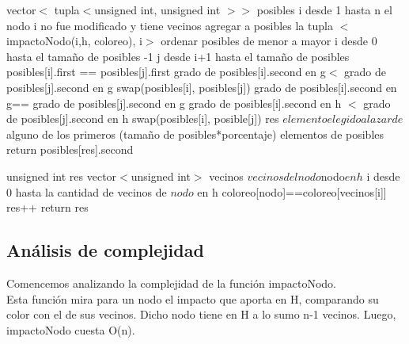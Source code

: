 \begin{algorithm}[H]
\caption{} 
\begin{codebox}
\li
\li 	vector$<$ tupla$<$unsigned int, unsigned int $> >$ posibles
\li     \For i desde 1 hasta n \Do
\li  		\If el nodo i no fue modificado y tiene vecinos \Do
\li				agregar a posibles la tupla $<$impactoNodo(i,h, coloreo), i$>$
			\End
		\End
\li 
\li 	ordenar posibles de menor a mayor
\li 	
\li 	\For i desde 0 hasta el tamaño de posibles -1 \Do
\li
\li 		\For j desde i+1 hasta el tamaño de posibles \Do
\li
\li 			\If posibles[i].first == posibles[j].first \Do
\li 				
\li 					\If grado de posibles[i].second en g$<$ grado de posibles[j].second en g\Do
\li 						swap(posibles[i], posibles[j])
						\End
\li						\Else 
\li 						\If grado de posibles[i].second en g== grado de posibles[j].second en g \Do
\li 							\If grado de posibles[i].second en h $<$ grado de posibles[j].second en h \Do
\li										swap(posibles[i], posible[j])
								\End
							\End
						\End
				\End
			\End
		\End
\li
\li
\li res \gets $elemento elegido al azar de $ 
\li          alguno de los primeros (tamaño de posibles*porcentaje) elementos de posibles
\li
\li return posibles[res].second
\li
\End
\end{codebox}
\end{algorithm}



\begin{algorithm}[H]
\caption{} 
\begin{codebox}
\li
\li unsigned int res 
\li vector$<$unsigned int$>$ vecinos \gets $vecinos del nodo $nodo$ en h$
\li
\li \For i desde 0 hasta la cantidad de vecinos de $nodo$ en h \Do
\li
\li 	\If coloreo[nodo]==coloreo[vecinos[i]] \Do
\li 		res++
		\End
	\End
\li
\li return res
\End
\end{codebox}
\end{algorithm}



\subsection{Análisis de complejidad}

\indent Comencemos analizando la complejidad de la función impactoNodo.\\
\indent Esta función mira para un nodo el impacto que aporta en H, comparando su color con el de sus vecinos. Dicho nodo tiene en H a lo sumo n-1 vecinos. Luego, impactoNodo cuesta O(n).

